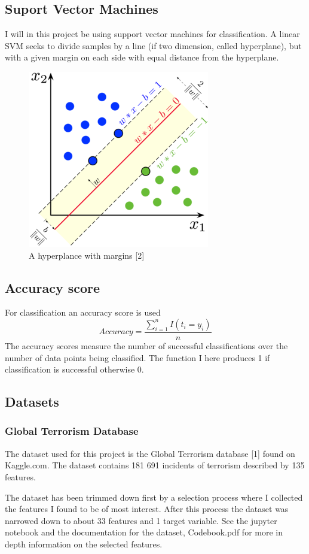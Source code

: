 \documentclass[reprint,english,notitlepage]{revtex4-2}  %
\begin{document}
\subsection{Suport Vector Machines}
I will in this project be using support vector machines for classification. A linear SVM seeks to divide samples by a line (if two dimension, called hyperplane), but with a given margin on each side with equal distance from the hyperplane.  
\begin{figure}[!htb]
	\centering\includegraphics[trim=0 0 0 0, scale=2]{300px-SVM_margin}
	\caption{A hyperplance with margins [2]}\label{figure}
\end{figure}

\subsection{Accuracy score}
For classification an accuracy score is used 
\[ Accuracy = \frac{\sum_{i=1}^{n}I(t_i=y_i)}{n}\]
The accuracy scores measure the number of successful classifications over the number of data points being classified. The function I here produces 1 if classification is successful otherwise 0. 

\subsection{Datasets}
\subsubsection{Global Terrorism Database}
The dataset used for this project is the Global Terrorism database [1] found on Kaggle.com. The dataset contains 181 691 incidents of terrorism described by 135 features.

The dataset has been trimmed down first by a selection process where I collected the features I found to be of most interest. After this process the dataset was narrowed down to about 33 features and 1 target variable. See the jupyter notebook and the documentation for the dataset, Codebook.pdf for more in depth information on the selected features. 
\end{document}
